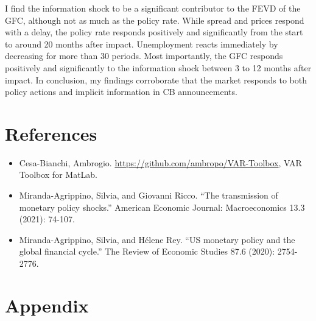\documentclass[11pt,a4paper]{article}
\begin{document}
I find the information shock to be a significant contributor to the FEVD of the GFC, although not as much as the policy rate. While spread and prices respond with a delay, the policy rate responds positively and significantly from the start to around 20 months after impact. Unemployment reacts immediately by decreasing for more than 30 periods. Most importantly, the GFC responds positively and significantly to the information shock between 3 to 12 months after impact.
In conclusion, my findings corroborate that the market responds to both policy actions and implicit information in CB announcements. 




\section*{References}
\begin{itemize}
    \item Cesa-Bianchi, Ambrogio. \url{https://github.com/ambropo/VAR-Toolbox}, VAR Toolbox for MatLab.
    \item Miranda-Agrippino, Silvia, and Giovanni Ricco. \enquote{The transmission of monetary policy shocks.} American Economic Journal: Macroeconomics 13.3 (2021): 74-107.
    \item Miranda-Agrippino, Silvia, and Hélene Rey. \enquote{US monetary policy and the global financial cycle.} The Review of Economic Studies 87.6 (2020): 2754-2776.
\end{itemize}



\section*{Appendix}
\end{document}
